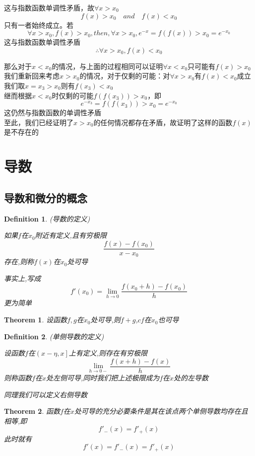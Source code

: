 \documentclass[11pt,hyperref,a4paper,UTF8]{ctexart}
\newtheorem{theorem}{Theorem}[subsection]
\newtheorem{definition}{Definition}[subsection]
\begin{document}
\begin{CJK}{UTF8}{gkai}
这与指数函数单调性矛盾，故$\forall x>x_0$
\[f(x)>x_0\quad and \quad f(x)<x_0\]
只有一者始终成立。若
\[\forall x>x_0,f(x)>x_0,then,\forall x>x_0,e^{-x}=f(f(x))>x_0=e^{-x_0}\]
这与指数函数单调性矛盾\\
\[\therefore\forall x>x_0,f(x)<x_0\]

那么对于$x<x_0$的情况，与上面的过程相同可以证明$\forall x<x_0$只可能有$f(x)>x_0$\\

我们重新回来考虑$x>x_0$的情况，对于仅剩的可能：对$\forall x>x_0$有$f(x)<x_0$成立\\
我们取$x=x_3>x_0$则有$f(x_3)<x_0$\\
继而根据$x<x_0$时仅剩的可能$f(f(x_3))>x_0$，即
\[e^{-x_3}=f(f(x_3))>x_0=e^{-x_0}\]
这仍然与指数函数的单调性矛盾\\
至此，我们已经证明了$x>x_0$的任何情况都存在矛盾，故证明了这样的函数$f(x)$是不存在的\\
\newpage
\section{导数}
\subsection{导数和微分的概念}
\begin{definition}
(导数的定义)

如果$f$在$x_0$附近有定义,且有穷极限
\[\dfrac{f(x) - f(x_0)}{ x - x_0}\]
存在,则称$f(x)$在$x_0$处可导

事实上,写成
\[f'(x_0) = \lim_{h\to 0} \dfrac{f(x_0 + h) - f(x_0)}{h}\]
更为简单
\end{definition}

\begin{theorem}
  设函数$f,g$在$x_0$处可导,则$f + g$,$cf$在$x_0$也可导
\end{theorem}

\begin{definition}
(单侧导数的定义)

设函数$f$在$\left(x - \eta,x \right]$上有定义,则存在有穷极限
\[\lim_{h\to 0-}\dfrac{f(x + h) - f(x)}{h}\]
则称函数$f$在$x$处左侧可导,同时我们把上述极限成为$f$在$x$处的左导数

同理我们可以定义右侧导数
\end{definition}

\begin{theorem}
  函数$f$在$x$处可导的充分必要条件是其在该点两个单侧导数均存在且相等,即
  \[f'_-(x) = f'_+(x)\]
  此时就有
  \[f'(x) = f'_-(x) = f'_+(x)\]
\end{theorem}


\end{CJK}
\end{document}
